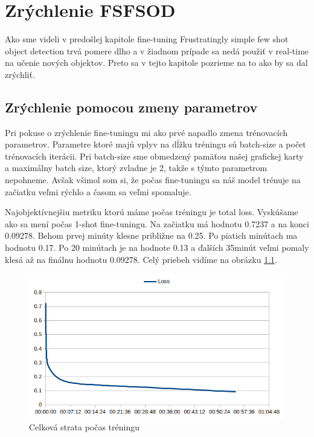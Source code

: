 \chapter{Zrýchlenie FSFSOD}\label{chap:proposal}

Ako sme videli v predošlej kapitole fine-tuning Frustratingly simple few shot object detection trvá pomere dlho a v žiadnom prípade sa nedá použiť v real-time na učenie nových objektov. Preto sa v tejto kapitole pozrieme na to ako by sa dal zrýchliť. 

\section{Zrýchlenie pomocou zmeny parametrov}

Pri pokuse o zrýchlenie fine-tuningu mi ako prvé napadlo zmena trénovacích parametrov. Parametre ktoré majú vplyv na dĺžku tréningu sú batch-size a počet trénovacích iterácii. Pri batch-size sme obmedzený pamäťou našej grafickej karty a maximálny batch size, ktorý zvladne je 2, takže s týmto parametrom nepohneme. Avšak všimol som si, že počas fine-tuningu sa náš model trénuje na začiatku veľmi rýchlo a časom sa veľmi spomaluje. 

Najobjektívnejšiu metriku ktorú máme počas tréningu je total loss. Vyskúšame ako sa mení počas 1-shot fine-tuningu. Na začiatku má hodnotu 0.7237 a na konci 0.09278. Behom prvej minúty klesne približne na 0.25. Po piatich minútach ma hodnotu 0.17. Po 20 minútach je na hodnote 0.13 a ďalších 35minút veľmi pomaly klesá až na finálnu hodnotu 0.09278. Celý priebeh vidíme na obrázku \ref{fig:image5}.

\begin{figure}[H]
\includegraphics[width=\textwidth]{images/1_shot_training_curve.png}
\centering
\caption{Celková strata počas tréningu}
\label{fig:image5}
\end{figure}

